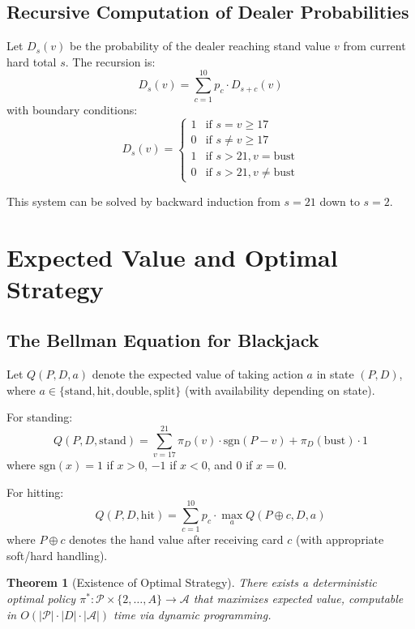 \documentclass[11pt,a4paper]{article}
\newtheorem{theorem}{Theorem}[section]
\theoremstyle{definition}
\begin{document}
\subsection{Recursive Computation of Dealer Probabilities}

Let $D_s(v)$ be the probability of the dealer reaching stand value $v$ from current hard total $s$. The recursion is:
\begin{equation}
D_s(v) = \sum_{c=1}^{10} p_c \cdot D_{s+c}(v)
\end{equation}
with boundary conditions:
\[
D_s(v) = \begin{cases}
1 & \text{if } s = v \geq 17 \\
0 & \text{if } s \neq v \geq 17 \\
1 & \text{if } s > 21, v = \text{bust} \\
0 & \text{if } s > 21, v \neq \text{bust}
\end{cases}
\]

This system can be solved by backward induction from $s = 21$ down to $s = 2$.

\section{Expected Value and Optimal Strategy}

\subsection{The Bellman Equation for Blackjack}

Let $Q(P, D, a)$ denote the expected value of taking action $a$ in state $(P, D)$, where $a \in \{\text{stand}, \text{hit}, \text{double}, \text{split}\}$ (with availability depending on state).

For standing:
\begin{equation}
Q(P, D, \text{stand}) = \sum_{v=17}^{21} \pi_D(v) \cdot \text{sgn}(P - v) + \pi_D(\text{bust}) \cdot 1
\end{equation}
where $\text{sgn}(x) = 1$ if $x > 0$, $-1$ if $x < 0$, and $0$ if $x = 0$.

For hitting:
\begin{equation}
Q(P, D, \text{hit}) = \sum_{c=1}^{10} p_c \cdot \max_a Q(P \oplus c, D, a)
\end{equation}
where $P \oplus c$ denotes the hand value after receiving card $c$ (with appropriate soft/hard handling).

\begin{theorem}[Existence of Optimal Strategy]
There exists a deterministic optimal policy $\pi^*: \mathcal{P} \times \{2,\ldots,A\} \to \mathcal{A}$ that maximizes expected value, computable in $O(|\mathcal{P}| \cdot |D| \cdot |\mathcal{A}|)$ time via dynamic programming.
\end{theorem}
\end{document}
